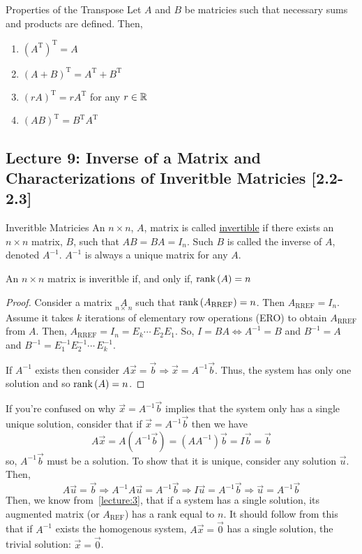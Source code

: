 \begin{thm}{Properties of the Transpose}{}
    Let $A$ and $B$ be matricies such that necessary sums and products are defined. Then, 
    \begin{enumerate}
        \item ${\left(A^{\text{T}}\right)}^{\text{T}} = A$
        \item ${\left(A+B\right)}^{\text{T}} = A^{\text{T}} + B^{\text{T}}$
        \item ${\left(rA\right)}^{\text{T}} = rA^{\text{T}}$ for any $r \in \mathbb R$
        \item ${\left(AB\right)}^{\text{T}} = B^{\text{T}}A^{\text{T}}$
    \end{enumerate}
\end{thm}

\subsection{Lecture 9: Inverse of a Matrix and Characterizations of Inveritble Matricies [2.2-2.3]}

\begin{defbox}{Inveritble Matricies}{}
    An $n \times n$, $A$, matrix is called \underline{invertible} if there exists an $n \times n$ matrix, $B$, such that $AB=BA=I_{n}$. Such $B$ is called the inverse of $A$, denoted $A^{-1}$. $A^{-1}$ is always a unique matrix for any $A$.
\end{defbox}

\begin{thm}{}{}
    An $n \times n$ matrix is inveritble if, and only if, $\text{rank}\left(A\right)=n$
    \begin{proof}
        Consider a matrix $\underset{n\times\,n}{A}$ such that $\text{rank}\left(A_\text{RREF}\right)=n$. Then $A_{\text{RREF}}=I_n$. Assume it takes $k$ iterations of elementary row operations (ERO) to obtain $A_{\text{RREF}}$ from $A$. Then, $A_{\text{RREF}}=I_n=E_k\cdots\,E_2E_1$. So, $I=BA \Leftrightarrow A^{-1}=B$ and $B^{-1}=A$ and $B^{-1}=E^{-1}_{1}E^{-1}_{2}\cdots\,E^{-1}_{k}$. 

        If $A^{-1}$ exists then consider $A\vec{x}=\vec{b} \Rightarrow \vec{x}=A^{-1}\vec{b}$. Thus, the system has only one solution and so $\text{rank}\left(A\right)=n$.
    \end{proof}
\end{thm}

If you're confused on why $\vec{x}=A^{-1}\vec{b}$ implies that the system only has a single unique solution, consider that if $\vec{x}=A^{-1}\vec{b}$ then we have 
\[
    A\vec{x} = A\left(A^{-1}\vec{b}\right) = \left(AA^{-1}\right)\vec{b} = I\vec{b} = \vec{b}
\]
so, $A^{-1}\vec{b}$ must be a solution. To show that it is unique, consider any solution $\vec{u}$. Then, 
\[
    A\vec{u} = \vec{b} \Rightarrow A^{-1}A\vec{u} = A^{-1}\vec{b} \Rightarrow I\vec{u} = A^{-1}\vec{b} \Rightarrow \vec{u} = A^{-1}\vec{b}
\]
Then, we know from~\ref{lecture:3}, that if a system has a single solution, its augmented matrix (or $A_{\text{REF}}$) has a rank equal to $n$. It should follow from this that if $A^{-1}$ exists the homogenous system, $A\vec{x}=\vec{0}$ has a single solution, the trivial solution: $\vec{x}=\vec{0}$.

